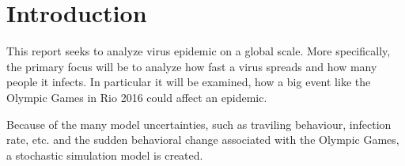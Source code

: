 \section{Introduction}
This report seeks to analyze virus epidemic on a global scale. More specifically, the primary focus will be to analyze how fast a virus spreads and how many people it infects. In particular it will be examined, how a big event like the Olympic Games in Rio 2016 could affect an epidemic.

Because of the many model uncertainties, such as traviling behaviour, infection rate, etc. and the sudden behavioral change associated with the Olympic Games, a stochastic simulation model is created.